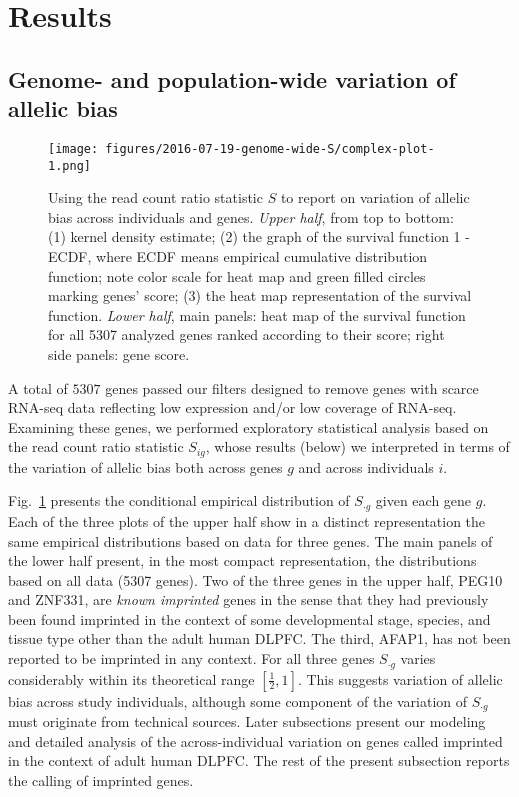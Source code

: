 \documentclass[12pt,letterpaper]{article}
\begin{document}
\section{Results}

\subsection{Genome- and population-wide variation of allelic bias}

\begin{figure}
\begin{center}
\texttt{[image: figures/2016-07-19-genome-wide-S/complex-plot-1.png]}
\end{center}
\caption{
Using the read count ratio statistic \(S\) to report on variation of allelic
bias across individuals and genes.  \emph{Upper half}, from top to bottom: (1)
kernel density estimate; (2) the graph of the survival function 1 - ECDF,
where ECDF means empirical cumulative distribution function; note color scale
for heat map and green filled circles marking genes' score; (3) the heat map
representation of the survival function.  \emph{Lower half}, main panels: heat
map of the survival function for all 5307 analyzed genes ranked according to
their score; right side panels: gene score.
}
\label{fig:ranking-genes}
\end{figure}

A total of \(5307\) genes passed our filters designed to remove genes with
scarce RNA-seq data reflecting low expression and/or low coverage of RNA-seq.
Examining these genes, we performed exploratory statistical analysis based on
the read count ratio statistic \(S_{ig}\), whose results (below) we
interpreted in terms of the variation of allelic bias both across genes \(g\)
and across individuals \(i\).

Fig.~\ref{fig:ranking-genes} presents the conditional empirical distribution
of \(S_{\cdot g}\) given each gene \(g\).  Each of the three plots of the
upper half show in a distinct representation the same empirical distributions
based on data for three genes.  The main panels of the lower half present, in
the most compact representation, the distributions based on all data (5307
genes).  Two of the three genes in the upper half, PEG10 and ZNF331, are
\emph{known imprinted} genes in the sense that they had previously been found
imprinted in the context of some developmental stage, species, and tissue type
other than the adult human DLPFC.  The third, AFAP1, has not been reported to be imprinted
in any context.  For all three genes \(S_{\cdot g}\) varies considerably
within its theoretical range \([\frac{1}{2}, 1]\).  This suggests variation of
allelic bias across study individuals, although some component of the
variation of \(S_{\cdot g}\) must originate from technical sources.  Later
subsections present our modeling and detailed analysis of the
across-individual variation on genes called imprinted in the context of adult
human DLPFC.  The rest of the present subsection reports the calling of
imprinted genes.
\end{document}
